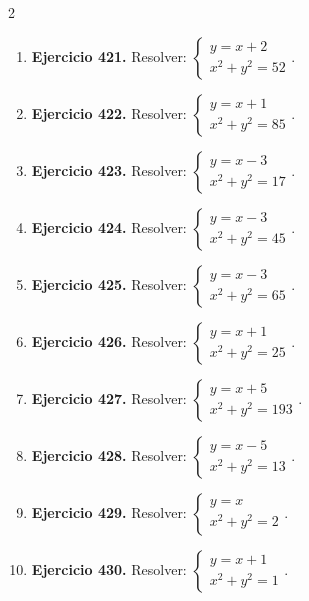\documentclass[10pt,a4paper]{article}
\begin{document}
\begin{multicols}{2}
\begin{enumerate}[label=\textbf{\arabic*.}]
\item \textbf{Ejercicio 421.} Resolver: \(\begin{cases}y=x+2\\x^2+y^2=52\end{cases}\).
\item \textbf{Ejercicio 422.} Resolver: \(\begin{cases}y=x+1\\x^2+y^2=85\end{cases}\).
\item \textbf{Ejercicio 423.} Resolver: \(\begin{cases}y=x-3\\x^2+y^2=17\end{cases}\).
\item \textbf{Ejercicio 424.} Resolver: \(\begin{cases}y=x-3\\x^2+y^2=45\end{cases}\).
\item \textbf{Ejercicio 425.} Resolver: \(\begin{cases}y=x-3\\x^2+y^2=65\end{cases}\).
\item \textbf{Ejercicio 426.} Resolver: \(\begin{cases}y=x+1\\x^2+y^2=25\end{cases}\).
\item \textbf{Ejercicio 427.} Resolver: \(\begin{cases}y=x+5\\x^2+y^2=193\end{cases}\).
\item \textbf{Ejercicio 428.} Resolver: \(\begin{cases}y=x-5\\x^2+y^2=13\end{cases}\).
\item \textbf{Ejercicio 429.} Resolver: \(\begin{cases}y=x\\x^2+y^2=2\end{cases}\).
\item \textbf{Ejercicio 430.} Resolver: \(\begin{cases}y=x+1\\x^2+y^2=1\end{cases}\).

\end{enumerate}
\end{multicols}
\end{document}

